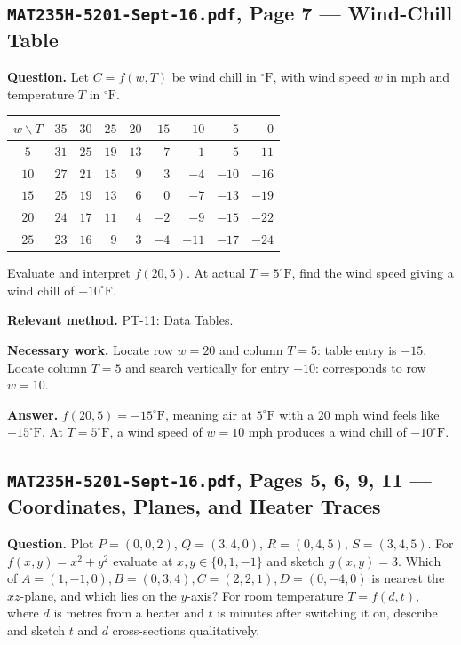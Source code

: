 \documentclass[11pt,letterpaper]{article}
\begin{document}
\subsection{\texttt{MAT235H-5201-Sept-16.pdf}, Page 7 --- Wind-Chill Table}
\textbf{Question.} Let $C = f(w,T)$ be wind chill in $^\circ\text{F}$, with wind speed $w$ in mph and temperature $T$ in $^\circ\text{F}$.
\begin{center}
\small
\begin{tabular}{c|rrrrrrrr}
\toprule
$w \backslash T$ & $35$ & $30$ & $25$ & $20$ & $15$ & $10$ & $5$ & $0$ \\
\midrule
$5$  & $31$ & $25$ & $19$ & $13$ & $7$  & $1$  & $-5$  & $-11$ \\
$10$ & $27$ & $21$ & $15$ & $9$  & $3$  & $-4$ & $-10$ & $-16$ \\
$15$ & $25$ & $19$ & $13$ & $6$  & $0$  & $-7$ & $-13$ & $-19$ \\
$20$ & $24$ & $17$ & $11$ & $4$  & $-2$ & $-9$ & $-15$ & $-22$ \\
$25$ & $23$ & $16$ & $9$  & $3$  & $-4$ & $-11$& $-17$ & $-24$ \\
\bottomrule
\end{tabular}
\end{center}
Evaluate and interpret $f(20,5)$. At actual $T = 5^\circ\text{F}$, find the wind speed giving a wind chill of $-10^\circ\text{F}$.

\textbf{Relevant method.} PT-11: Data Tables.

\textbf{Necessary work.}
Locate row $w=20$ and column $T=5$: table entry is $-15$.
Locate column $T=5$ and search vertically for entry $-10$: corresponds to row $w=10$.

\textbf{Answer.}
$f(20,5) = -15^\circ\text{F}$, meaning air at $5^\circ\text{F}$ with a $20$ mph wind feels like $-15^\circ\text{F}$. At $T = 5^\circ\text{F}$, a wind speed of $w = 10$ mph produces a wind chill of $-10^\circ\text{F}$.

\subsection{\texttt{MAT235H-5201-Sept-16.pdf}, Pages 5, 6, 9, 11 --- Coordinates, Planes, and Heater Traces}
\textbf{Question.} Plot $P=(0,0,2)$, $Q=(3,4,0)$, $R=(0,4,5)$, $S=(3,4,5)$. For $f(x,y)=x^2+y^2$ evaluate at $x,y \in \{0,1,-1\}$ and sketch $g(x,y)=3$. Which of $A=(1,-1,0), B=(0,3,4), C=(2,2,1), D=(0,-4,0)$ is nearest the $xz$-plane, and which lies on the $y$-axis? For room temperature $T = f(d,t)$, where $d$ is metres from a heater and $t$ is minutes after switching it on, describe and sketch $t$ and $d$ cross-sections qualitatively.
\end{document}
